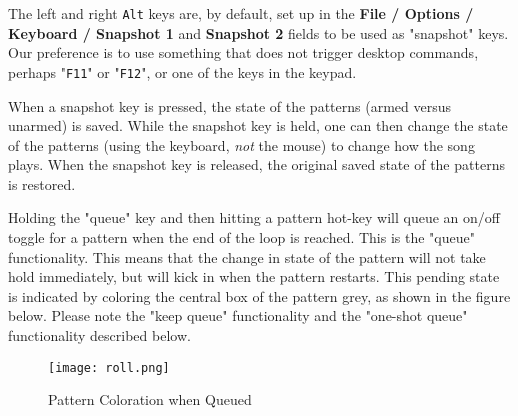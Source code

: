    The left and right \texttt{Alt} keys are, by default, set up in the
   \textbf{File / Options / Keyboard / Snapshot 1} and
   \textbf{Snapshot 2} fields to be used as "snapshot" keys.
   Our preference is to use something that does not trigger desktop
   commands, perhaps "\texttt{F11}" or "\texttt{F12}", or one of the keys in
   the keypad.

   When a snapshot key is pressed, the state of the patterns
   (armed versus unarmed) is saved.  While the
   snapshot key is held, one can then change the state of the patterns
   (using the keyboard, \textsl{not} the mouse)
   to change how the song plays.  When the snapshot key is released, the
   original saved state of the patterns is restored.



   Holding the "queue" key and then hitting a pattern hot-key
   will queue an on/off toggle for a pattern when the end of the loop is
   reached.
   This is the "queue" functionality.
   This means that the change in state of the pattern will not take hold
   immediately, but will kick in when the pattern restarts.
   This pending state is indicated by coloring the central box of the
   pattern grey, as shown in the figure below.
   Please note the "keep queue" functionality and
   the "one-shot queue" functionality described below.

\begin{figure}[H]
   \centering 
   \texttt{[image: roll.png]}
   \caption{Pattern Coloration when Queued}
   \label{fig:queueing_coloration}
\end{figure}

